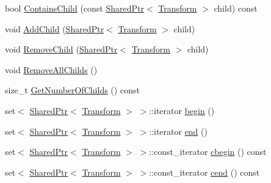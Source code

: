 \begin{DoxyCompactItemize}
\item 
bool \hyperlink{structmage_1_1_transform_a5a37f49cfb1f631ee580f368f8f84d87}{Contains\+Child} (const \hyperlink{namespacemage_a1e01ae66713838a7a67d30e44c67703e}{Shared\+Ptr}$<$ \hyperlink{structmage_1_1_transform}{Transform} $>$ child) const
\item 
void \hyperlink{structmage_1_1_transform_ac9fb285f730207740114b61bdb010bf9}{Add\+Child} (\hyperlink{namespacemage_a1e01ae66713838a7a67d30e44c67703e}{Shared\+Ptr}$<$ \hyperlink{structmage_1_1_transform}{Transform} $>$ child)
\item 
void \hyperlink{structmage_1_1_transform_a387bb274fec0cc5ea8d6f3504536ad50}{Remove\+Child} (\hyperlink{namespacemage_a1e01ae66713838a7a67d30e44c67703e}{Shared\+Ptr}$<$ \hyperlink{structmage_1_1_transform}{Transform} $>$ child)
\item 
void \hyperlink{structmage_1_1_transform_a1f9e00affb4b41338a6a946867a1d5a4}{Remove\+All\+Childs} ()
\item 
size\+\_\+t \hyperlink{structmage_1_1_transform_a4661691249d08ea41f9ee44f9838f0ed}{Get\+Number\+Of\+Childs} () const
\item 
set$<$ \hyperlink{namespacemage_a1e01ae66713838a7a67d30e44c67703e}{Shared\+Ptr}$<$ \hyperlink{structmage_1_1_transform}{Transform} $>$ $>$\+::iterator \hyperlink{structmage_1_1_transform_a1186287515ef9ca67078cbef3003919e}{begin} ()
\item 
set$<$ \hyperlink{namespacemage_a1e01ae66713838a7a67d30e44c67703e}{Shared\+Ptr}$<$ \hyperlink{structmage_1_1_transform}{Transform} $>$ $>$\+::iterator \hyperlink{structmage_1_1_transform_ae164a6f43283fa98ca3bd13779b1ebd1}{end} ()
\item 
set$<$ \hyperlink{namespacemage_a1e01ae66713838a7a67d30e44c67703e}{Shared\+Ptr}$<$ \hyperlink{structmage_1_1_transform}{Transform} $>$ $>$\+::const\+\_\+iterator \hyperlink{structmage_1_1_transform_aeafb71be299fdb8aad68321ae0d957d6}{cbegin} () const
\item 
set$<$ \hyperlink{namespacemage_a1e01ae66713838a7a67d30e44c67703e}{Shared\+Ptr}$<$ \hyperlink{structmage_1_1_transform}{Transform} $>$ $>$\+::const\+\_\+iterator \hyperlink{structmage_1_1_transform_a9d021050eafdbaa7a19d6a7de49a9641}{cend} () const
\end{DoxyCompactItemize}
